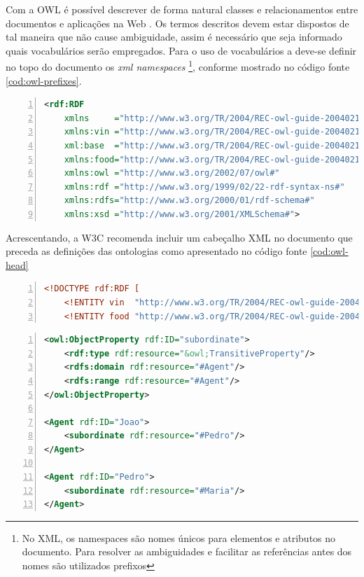 Com a OWL é possível descrever de forma natural classes e relacionamentos entre documentos e aplicações na Web \citep{OWLReport:2005}. Os termos descritos devem estar dispostos de tal maneira que não cause ambiguidade, assim é necessário que seja informado quais vocabulários serão empregados. Para o uso de vocabulários a \citep{OWLW3C} deve-se definir no topo do documento os \textit{xml namespaces} \footnote{No XML, os namespaces são nomes únicos para elementos e atributos no documento. Para resolver as ambiguidades e facilitar as referências antes dos nomes são utilizados prefixos}, conforme mostrado no código fonte \ref{cod:owl-prefixes}.

\begin{lstlisting}[caption=Exemplo do topo de um documento OWL, language=XML, frame=single, label={cod:owl-prefixes}, float, numbers=left]
<rdf:RDF 
    xmlns     ="http://www.w3.org/TR/2004/REC-owl-guide-20040210/wine#" 
    xmlns:vin ="http://www.w3.org/TR/2004/REC-owl-guide-20040210/wine#"       
    xml:base  ="http://www.w3.org/TR/2004/REC-owl-guide-20040210/wine#"       
    xmlns:food="http://www.w3.org/TR/2004/REC-owl-guide-20040210/food#"    
    xmlns:owl ="http://www.w3.org/2002/07/owl#"
    xmlns:rdf ="http://www.w3.org/1999/02/22-rdf-syntax-ns#"
    xmlns:rdfs="http://www.w3.org/2000/01/rdf-schema#"
    xmlns:xsd ="http://www.w3.org/2001/XMLSchema#">
\end{lstlisting}

Acrescentando, a W3C recomenda incluir um cabeçalho XML no documento que preceda as definições das ontologias como apresentado no código fonte \ref{cod:owl-head}

\begin{lstlisting}[caption=Exemplo do cabeçalho XML de um documento OWL, language=XML, frame=single, label={cod:owl-head}, float, numbers=left]
<!DOCTYPE rdf:RDF [
    <!ENTITY vin  "http://www.w3.org/TR/2004/REC-owl-guide-20040210/wine#" >
    <!ENTITY food "http://www.w3.org/TR/2004/REC-owl-guide-20040210/food#" > ]>
\end{lstlisting}

\begin{lstlisting}[caption=Exemplo de propriedades transitivas no OWL, language=XML, frame=single, label={cod:owl-props}, float, numbers=left]
<owl:ObjectProperty rdf:ID="subordinate">
    <rdf:type rdf:resource="&owl;TransitiveProperty"/>
    <rdfs:domain rdf:resource="#Agent"/>
    <rdfs:range rdf:resource="#Agent"/>
</owl:ObjectProperty>

<Agent rdf:ID="Joao">
    <subordinate rdf:resource="#Pedro"/>
</Agent>

<Agent rdf:ID="Pedro">
    <subordinate rdf:resource="#Maria"/>
</Agent>
\end{lstlisting}

